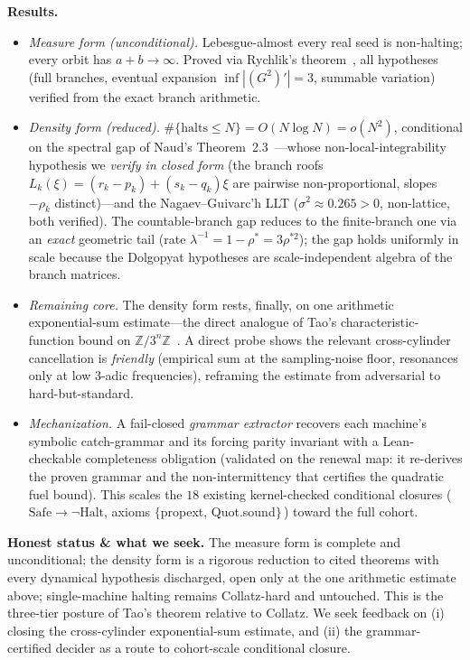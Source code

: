 \documentclass[10pt]{article}
\begin{document}
\noindent\textbf{Results.}
\begin{itemize}
\item \emph{Measure form (unconditional).} Lebesgue-almost every real seed is
non-halting; every orbit has $a+b\to\infty$. Proved via Rychlik's
theorem~\cite{Rychlik1983}, all hypotheses (full branches, eventual expansion
$\inf|(G^2)'|=3$, summable variation) verified from the exact branch arithmetic.
\item \emph{Density form (reduced).} $\#\{\text{halts}\le N\}=O(N\log N)=o(N^2)$,
conditional on the spectral gap of Naud's Theorem~2.3~\cite{Naud2005}---whose
non-local-integrability hypothesis we \emph{verify in closed form} (the branch
roofs $L_k(\xi)=(r_k-p_k)+(s_k-q_k)\xi$ are pairwise non-proportional,
slopes $-\rho_k$ distinct)---and the Nagaev--Guivarc'h LLT ($\sigma^2\approx0.265>0$,
non-lattice, both verified). The countable-branch gap reduces to the finite-branch
one via an \emph{exact} geometric tail (rate $\lambda^{-1}=1-\rho^\ast=3\rho^{\ast2}$);
the gap holds uniformly in scale because the Dolgopyat hypotheses are
scale-independent algebra of the branch matrices.
\item \emph{Remaining core.} The density form rests, finally, on one arithmetic
exponential-sum estimate---the direct analogue of Tao's
characteristic-function bound on $\mathbb Z/3^n\mathbb Z$~\cite{Tao2022}. A direct
probe shows the relevant cross-cylinder cancellation is \emph{friendly} (empirical
sum at the sampling-noise floor, resonances only at low 3-adic frequencies),
reframing the estimate from adversarial to hard-but-standard.
\item \emph{Mechanization.} A fail-closed \emph{grammar extractor} recovers each
machine's symbolic catch-grammar and its forcing parity invariant with a
Lean-checkable completeness obligation (validated on the renewal map: it
re-derives the proven grammar and the non-intermittency that certifies the
quadratic fuel bound). This scales the $18$ existing kernel-checked conditional
closures (\,$\mathrm{Safe}\to\neg\mathrm{Halt}$, axioms $\{$propext, Quot.sound$\}$\,)
toward the full cohort.
\end{itemize}

\noindent\textbf{Honest status \& what we seek.} The measure form is complete
and unconditional; the density form is a rigorous reduction to cited theorems
with every dynamical hypothesis discharged, open only at the one arithmetic
estimate above; single-machine halting remains Collatz-hard and untouched. This
is the three-tier posture of Tao's theorem relative to Collatz. We seek feedback
on (i) closing the cross-cylinder exponential-sum estimate, and (ii) the
grammar-certified decider as a route to cohort-scale conditional closure.
\end{document}
